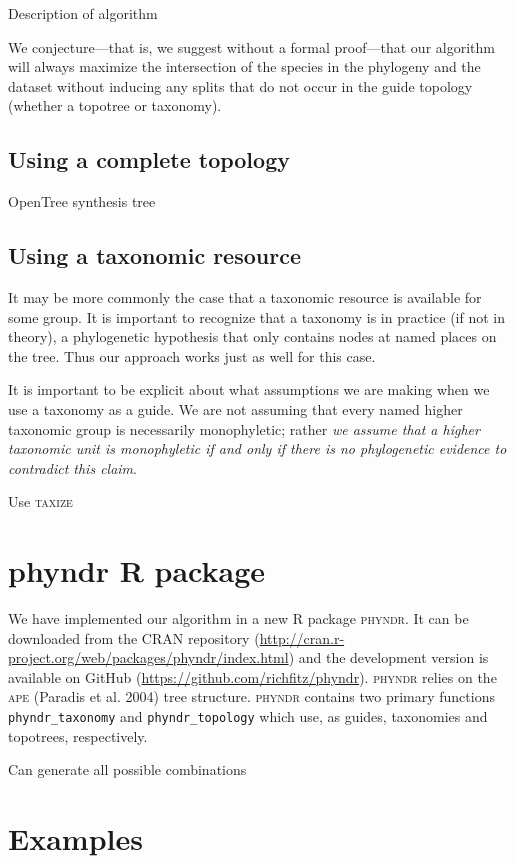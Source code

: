 \documentclass[a4paper,11pt]{article}
\begin{document}
Description of algorithm

We conjecture---that is, we suggest without a formal proof---that our algorithm will always maximize the intersection of the species in the phylogeny and the dataset without inducing any splits that do not occur in the guide topology (whether a topotree or taxonomy).

\subsection{Using a complete topology}

OpenTree synthesis tree

\subsection{Using a taxonomic resource}

It may be more commonly the case that a taxonomic resource is available for some group. It is important to recognize that a taxonomy is in practice (if not in theory), a phylogenetic hypothesis that only contains nodes at named places on the tree. Thus our approach works just as well for this case.

It is important to be explicit about what assumptions we are making when we use a taxonomy as a guide. We are not assuming that every named higher taxonomic group is necessarily monophyletic; rather \emph{we assume that a higher taxonomic unit is monophyletic if and only if there is no phylogenetic evidence to contradict this claim}.  

Use \textsc{taxize} \citep{taxize}

\section{phyndr R package}

We have implemented our algorithm in a new R package \textsc{phyndr}. It can be downloaded from the CRAN repository (\url{http://cran.r-project.org/web/packages/phyndr/index.html}) and the development version is available on GitHub (\url{https://github.com/richfitz/phyndr}). \textsc{phyndr} relies on the \textsc{ape} (Paradis et al. 2004) tree structure. \textsc{phyndr} contains two primary functions \texttt{phyndr\_taxonomy} and \texttt{phyndr\_topology} which use, as guides, taxonomies and topotrees, respectively. 

Can generate all possible combinations

\section{Examples}
\end{document}
